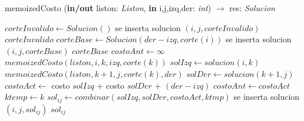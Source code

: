 \begin{algorithm}
\caption{memoizedCosto (\textbf{in/out} liston: \textsl{Liston}, \textbf{in} i,j,izq,der: \textsl{int}) $\rightarrow$ res: \textsl{Solucion}}
\begin{algorithmic}[1]

		\STATE $corteInvalido \leftarrow Solucion()$
		\STATE se inserta solucion $(i,j,corteInvalido)$
		\RETURN $corteInvalido$
	\ELSE
		\STATE $corteBase \leftarrow Solucion(der-izq, corte(i))$
		\STATE se inserta solucion $(i,j,corteBase)$
		\RETURN $corteBase$
	\ENDIF
\ELSE
	\STATE $costoAnt \leftarrow \infty$
			\STATE $memoizedCosto(liston,i,k,izq,corte(k))$
		\ENDIF
		\STATE $solIzq \leftarrow solucion(i,k)$
			\STATE $memoizedCosto(liston,k+1,j,corte(k),der)$
		\ENDIF
		\STATE $solDer \leftarrow solucion(k+1,j)$
		\STATE $costoAct \leftarrow$ costo $solIzq$ $+$ costo $solDer$ $+$ $(der-izq)$
			\STATE $costoAnt \leftarrow costoAct$
			\STATE $ktemp \leftarrow k$
			\STATE $sol_{ij} \leftarrow combinar(solIzq,solDer,costoAct,ktmp)$
		\ENDIF
	\ENDFOR
	\STATE se inserta solucion $(i,j,sol_{ij})$
	\RETURN $sol_{ij}$
\ENDIF
\end{algorithmic}
\end{algorithm}

